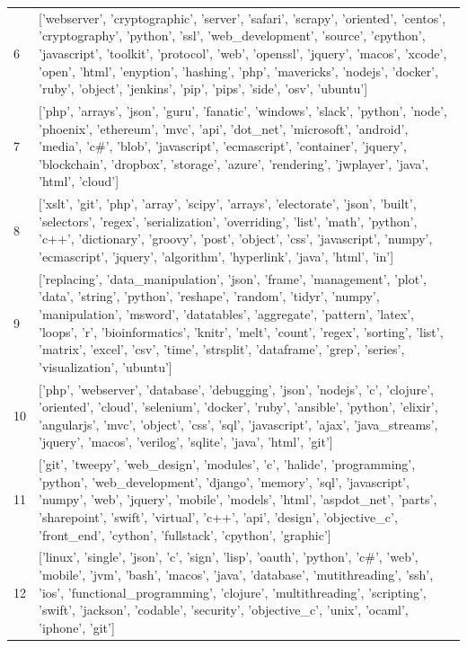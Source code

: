 \begin{center}
\begin{longtable}{|p{1.5cm}|p{12.5cm}|}
            6 & ['webserver', 'cryptographic', 'server', 'safari', 'scrapy', 'oriented', 'centos', 'cryptography', 'python', 'ssl', 'web\_development', 'source', 'cpython', 'javascript', 'toolkit', 'protocol', 'web', 'openssl', 'jquery', 'macos', 'xcode', 'open', 'html', 'enyption', 'hashing', 'php', 'mavericks', 'nodejs', 'docker', 'ruby', 'object', 'jenkins', 'pip', 'pips', 'side', 'osv', 'ubuntu']  \\ 
            7 & ['php', 'arrays', 'json', 'guru', 'fanatic', 'windows', 'slack', 'python', 'node', 'phoenix', 'ethereum', 'mvc', 'api', 'dot\_net', 'microsoft', 'android', 'media', 'c\#', 'blob', 'javascript', 'ecmascript', 'container', 'jquery', 'blockchain', 'dropbox', 'storage', 'azure', 'rendering', 'jwplayer', 'java', 'html', 'cloud']  \\ 
            8 & ['xslt', 'git', 'php', 'array', 'scipy', 'arrays', 'electorate', 'json', 'built', 'selectors', 'regex', 'serialization', 'overriding', 'list', 'math', 'python', 'c++', 'dictionary', 'groovy', 'post', 'object', 'css', 'javascript', 'numpy', 'ecmascript', 'jquery', 'algorithm', 'hyperlink', 'java', 'html', 'in']  \\ 
            9 & ['replacing', 'data\_manipulation', 'json', 'frame', 'management', 'plot', 'data', 'string', 'python', 'reshape', 'random', 'tidyr', 'numpy', 'manipulation', 'msword', 'datatables', 'aggregate', 'pattern', 'latex', 'loops', 'r', 'bioinformatics', 'knitr', 'melt', 'count', 'regex', 'sorting', 'list', 'matrix', 'excel', 'csv', 'time', 'strsplit', 'dataframe', 'grep', 'series', 'visualization', 'ubuntu']  \\ 
            10 & ['php', 'webserver', 'database', 'debugging', 'json', 'nodejs', 'c', 'clojure', 'oriented', 'cloud', 'selenium', 'docker', 'ruby', 'ansible', 'python', 'elixir', 'angularjs', 'mvc', 'object', 'css', 'sql', 'javascript', 'ajax', 'java\_streams', 'jquery', 'macos', 'verilog', 'sqlite', 'java', 'html', 'git']  \\ 
            11 & ['git', 'tweepy', 'web\_design', 'modules', 'c', 'halide', 'programming', 'python', 'web\_development', 'django', 'memory', 'sql', 'javascript', 'numpy', 'web', 'jquery', 'mobile', 'models', 'html', 'aspdot\_net', 'parts', 'sharepoint', 'swift', 'virtual', 'c++', 'api', 'design', 'objective\_c', 'front\_end', 'cython', 'fullstack', 'cpython', 'graphic']  \\ 
            12 & ['linux', 'single', 'json', 'c', 'sign', 'lisp', 'oauth', 'python', 'c\#', 'web', 'mobile', 'jvm', 'bash', 'macos', 'java', 'database', 'mutithreading', 'ssh', 'ios', 'functional\_programming', 'clojure', 'multithreading', 'scripting', 'swift', 'jackson', 'codable', 'security', 'objective\_c', 'unix', 'ocaml', 'iphone', 'git']  \\ 

\end{longtable}
\end{center}
